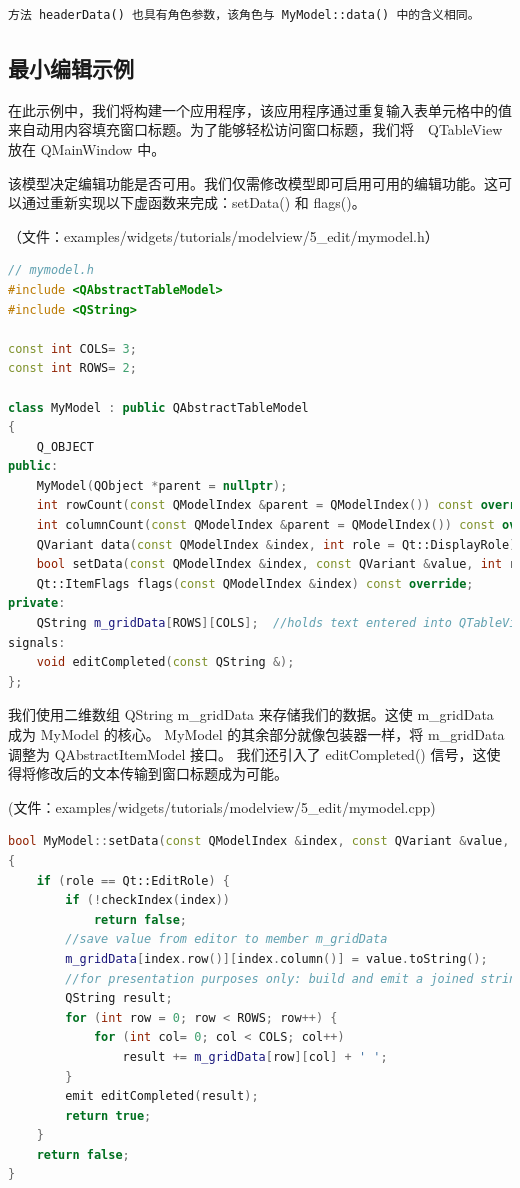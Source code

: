 \begin{lstlisting}
方法 headerData() 也具有角色参数，该角色与 MyModel::data() 中的含义相同。
\end{lstlisting}

\subsection{最小编辑示例}

在此示例中，我们将构建一个应用程序，该应用程序通过重复输入表单元格中的值来自动用内容填充窗口标题。为了能够轻松访问窗口标题，我们将　QTableView 放在 QMainWindow 中。

该模型决定编辑功能是否可用。我们仅需修改模型即可启用可用的编辑功能。这可以通过重新实现以下虚函数来完成：setData() 和 flags()。

（文件：examples/widgets/tutorials/modelview/5\_edit/mymodel.h）


\begin{lstlisting}[language=C++]
// mymodel.h
#include <QAbstractTableModel>
#include <QString>

const int COLS= 3;
const int ROWS= 2;

class MyModel : public QAbstractTableModel
{
    Q_OBJECT
public:
    MyModel(QObject *parent = nullptr);
    int rowCount(const QModelIndex &parent = QModelIndex()) const override;
    int columnCount(const QModelIndex &parent = QModelIndex()) const override;
    QVariant data(const QModelIndex &index, int role = Qt::DisplayRole) const override;
    bool setData(const QModelIndex &index, const QVariant &value, int role = Qt::EditRole) override;
    Qt::ItemFlags flags(const QModelIndex &index) const override;
private:
    QString m_gridData[ROWS][COLS];  //holds text entered into QTableView
signals:
    void editCompleted(const QString &);
};
\end{lstlisting}

我们使用二维数组 QString m\_gridData 来存储我们的数据。这使 m\_gridData 成为 MyModel 的核心。
MyModel 的其余部分就像包装器一样，将 m\_gridData 调整为 QAbstractItemModel 接口。
我们还引入了 editCompleted() 信号，这使得将修改后的文本传输到窗口标题成为可能。

(文件：examples/widgets/tutorials/modelview/5\_edit/mymodel.cpp)

\begin{lstlisting}[language=C++]
bool MyModel::setData(const QModelIndex &index, const QVariant &value, int role)
{
    if (role == Qt::EditRole) {
        if (!checkIndex(index))
            return false;
        //save value from editor to member m_gridData
        m_gridData[index.row()][index.column()] = value.toString();
        //for presentation purposes only: build and emit a joined string
        QString result;
        for (int row = 0; row < ROWS; row++) {
            for (int col= 0; col < COLS; col++)
                result += m_gridData[row][col] + ' ';
        }
        emit editCompleted(result);
        return true;
    }
    return false;
}
\end{lstlisting}
    

